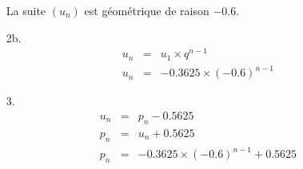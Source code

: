 \documentclass[11pt]{article}
\begin{document}
\begin{multicols}{2}
\begin{enumerate}
    La suite $(u_n)$ est géométrique de raison $-0.6$.
    
  \item[2b.] 
    \begin{eqnarray*}
      u_n &=& u_1 \times q^{n-1} \\
      u_n &=& -0.3625 \times (-0.6)^{n-1}
    \end{eqnarray*}
    
  \item[3.] 
    \begin{eqnarray*}
      u_n &=& p_n - 0.5625 \\
      p_n &=& u_n + 0.5625 \\
      p_n &=& -0.3625 \times (-0.6)^{n-1} + 0.5625 \\ 
    \end{eqnarray*}


  \end{enumerate}
\end{multicols}
\end{document}
